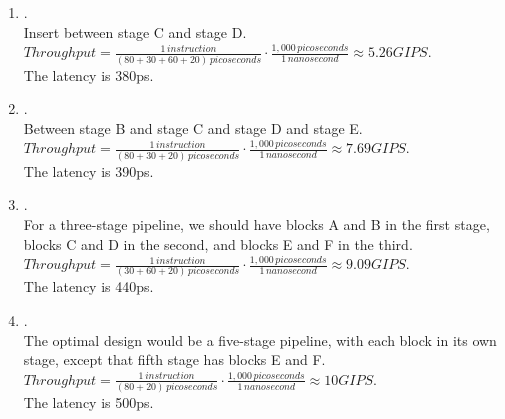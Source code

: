 \documentclass{article}
\begin{document}
\begin{enumerate}[label=\textbf{\Alph*.}]
	\item . \\
	Insert between stage C and stage D. \\
	$Throughput = \frac{1\,instruction}{(80 + 30 + 60 + 20)\,picoseconds} \cdot
	\frac{1,000\,picoseconds}{1\,nanosecond} \approx 5.26 GIPS$. \\
	The latency is 380ps.
	\item . \\
	Between stage B and stage C and stage D and stage E. \\
	$Throughput = \frac{1\,instruction}{(80 + 30 + 20)\,picoseconds} \cdot
	\frac{1,000\,picoseconds}{1\,nanosecond} \approx 7.69 GIPS$. \\
	The latency is 390ps.
	\item . \\
	For a three-stage pipeline, we should have blocks A and B in the first stage,
	blocks C and D in the second, and blocks E and F in the third. \\
	$Throughput = \frac{1\,instruction}{(30 + 60 + 20)\,picoseconds} \cdot
	\frac{1,000\,picoseconds}{1\,nanosecond} \approx 9.09 GIPS$. \\
	The latency is 440ps.
	\item . \\
	The optimal design would be a five-stage pipeline, with each block in its own
	stage, except that fifth stage has blocks E and F.
	$Throughput = \frac{1\,instruction}{(80 + 20)\,picoseconds} \cdot
	\frac{1,000\,picoseconds}{1\,nanosecond} \approx 10 GIPS$. \\
	The latency is 500ps.
\end{enumerate}
\end{document}
